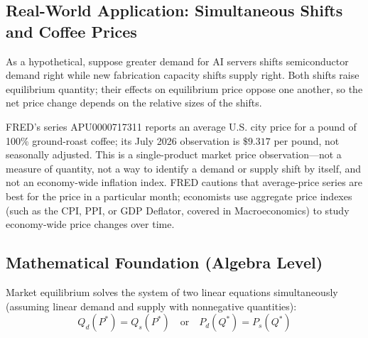 \documentclass[11pt,letterpaper]{article}
\begin{document}
\subsection*{Real-World Application: Simultaneous Shifts and Coffee Prices}
As a hypothetical, suppose greater demand for AI servers shifts semiconductor demand right while new fabrication capacity shifts supply right. Both shifts raise equilibrium quantity; their effects on equilibrium price oppose one another, so the net price change depends on the relative sizes of the shifts.

FRED's series APU0000717311 reports an average U.S. city price for a pound of 100\% ground-roast coffee; its July 2026 observation is $\$9.317$ per pound, not seasonally adjusted. This is a single-product market price observation—not a measure of quantity, not a way to identify a demand or supply shift by itself, and not an economy-wide inflation index. FRED cautions that average-price series are best for the price in a particular month; economists use aggregate price indexes (such as the CPI, PPI, or GDP Deflator, covered in Macroeconomics) to study economy-wide price changes over time.

\subsection*{Mathematical Foundation (Algebra Level)}
Market equilibrium solves the system of two linear equations simultaneously (assuming linear demand and supply with nonnegative quantities):
\begin{equation}
Q_d(P^*) = Q_s(P^*) \quad \text{or} \quad P_d(Q^*) = P_s(Q^*)
\end{equation}
\end{document}
